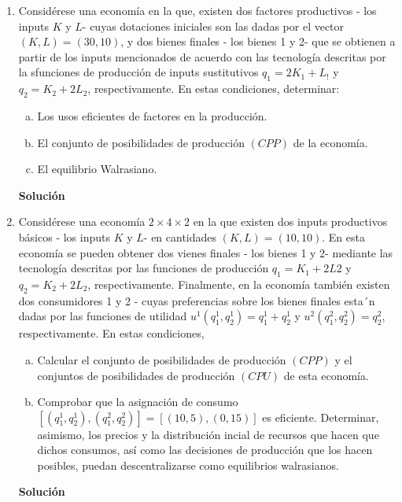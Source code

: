 \documentclass[10pt,a4paper]{article}
\begin{document}
\begin{enumerate}
			
	\item Considérese una economía en la que, existen dos factores productivos - los inputs $K$ y $L$- cuyas dotaciones iniciales son las dadas por el vector $(K,L) = (30,10)$, y dos bienes finales - los bienes 1 y 2- que se obtienen a partir de los inputs mencionados de acuerdo con las tecnología descritas por la sfunciones de producción de inputs sustitutivos $q_1 = 2K_1 + L_!$ y $q_2 = K_2 + 2L_2$, respectivamente. En estas condiciones, determinar:
		\begin{enumerate}[a)]
			\item Los usos eficientes de factores en la producción.
			\item El conjunto de posibilidades de producción $(CPP)$ de la economía.
			\item El equilibrio Walrasiano.
		\end{enumerate}
		\textbf{\LARGE Solución}\\
			
	\item Considérese una economía $2 \times 4 \times 2 $ en la que existen dos inputs productivos básicos - los inputs $K$ y $L$- en cantidades $(K,L) = (10,10)$. En esta economía se pueden obtener dos vienes finales - los bienes 1 y 2- mediante las tecnología descritas por las funciones de producción $q_1 = K_1 + 2L2$ y $q_2 = K_2 + 2L_2$, respectivamente. Finalmente, en la economía también existen dos consumidores 1 y 2 - cuyas preferencias sobre los bienes finales esta´n dadas por las funciones de utilidad $u^1\left( q_{1}^{1},q_{2}^{1}\right) = q_{1}^{1} + q_{2}^{1}$ y $u^2\left( q_{1}^{2},q_{2}^{2}\right) = q_{2}^{2}$, respectivamente. En estas condiciones,
		\begin{enumerate}[a)]
			\item Calcular el conjunto de posibilidades de producción $(CPP)$ y el conjuntos de posibilidades de producción $(CPU)$ de esta economía.
			\item Comprobar que la asignación de consumo $\left[\left( q_{1}^{1},q_{2}^{1}\right), \left( q_{1}^{2},q_{2}^{2}\right)\right] = \left[\left( 10,5 \right), \left( 0,15\right)\right]$ es eficiente. Determinar, asimismo, los precios y la distribución incial de recursos que hacen que dichos consumos, así como las decisiones de producción que los hacen posibles, puedan descentralizarse como equilibrios walrasianos.
		\end{enumerate}
		\textbf{\LARGE Solución}\\
			
\end{enumerate}
\end{document}

